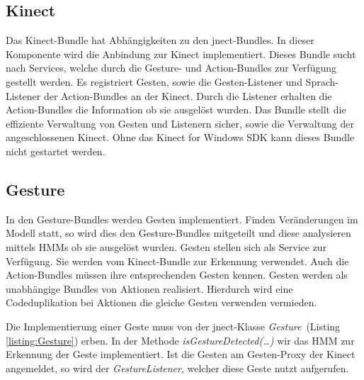 \subsection{Kinect}

Das Kinect-Bundle hat Abh\"angigkeiten zu den jnect-Bundles. In dieser Komponente wird die Anbindung zur Kinect implementiert. Dieses Bundle 
sucht nach Services, welche durch die Gesture- und Action-Bundles zur Verf\"ugung gestellt werden. Es registriert Gesten, sowie die 
Gesten-Listener und Sprach-Listener der Action-Bundles an der Kinect. Durch die Listener erhalten die Action-Bundles die Information 
ob sie ausgel\"ost wurden. Das Bundle stellt die effiziente Verwaltung von Gesten und Listenern sicher, sowie die Verwaltung der 
angeschlossenen Kinect. Ohne das Kinect for Windows \acrshort{SDK} kann dieses Bundle nicht gestartet werden.

\subsection{Gesture}

In den Gesture-Bundles werden Gesten implementiert. Finden Ver\"anderungen im Modell statt, so wird dies den Gesture-Bundles mitgeteilt und 
diese analysieren mittels HMMs ob sie ausgel\"ost wurden. Gesten stellen sich als Service zur Verf\"ugung. Sie werden vom Kinect-Bundle zur 
Erkennung verwendet. Auch die Action-Bundles m\"ussen ihre entsprechenden Gesten kennen. Gesten werden als unabh\"angige Bundles von Aktionen 
realisiert. Hierdurch wird eine Codeduplikation bei Aktionen die gleiche Gesten verwenden vermieden.

Die Implementierung einer Geste muss von der jnect-Klasse \textit{Gesture}~(Listing \ref{listing:Gesture}) erben. In der Methode 
\textit{isGestureDetected(\ldots)} wir das HMM zur Erkennung der Geste implementiert. Ist die Gesten am Gesten-Proxy der Kinect 
angemeldet, so wird der \textit{GestureListener}, welcher diese Geste nutzt aufgerufen.

